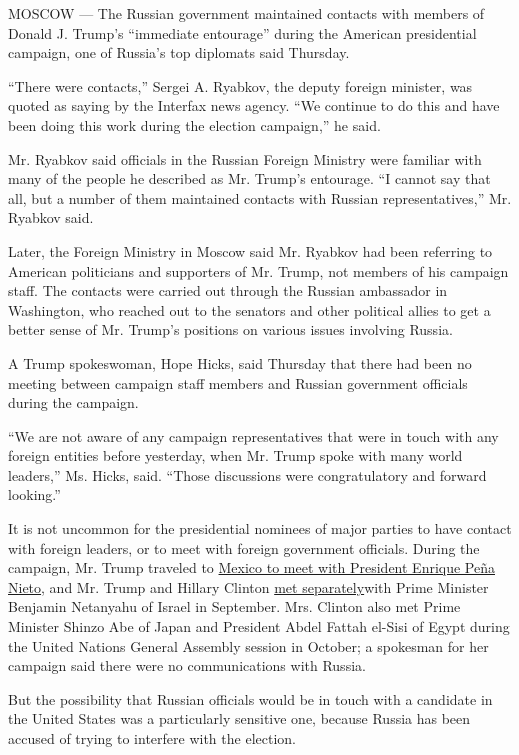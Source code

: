MOSCOW --- The Russian government maintained contacts with members of
Donald J. Trump's ``immediate entourage'' during the American
presidential campaign, one of Russia's top diplomats said Thursday.

``There were contacts,'' Sergei A. Ryabkov, the deputy foreign minister,
was quoted as saying by the Interfax news agency. ``We continue to do
this and have been doing this work during the election campaign,'' he
said.

Mr. Ryabkov said officials in the Russian Foreign Ministry were familiar
with many of the people he described as Mr. Trump's entourage. ``I
cannot say that all, but a number of them maintained contacts with
Russian representatives,'' Mr. Ryabkov said.

Later, the Foreign Ministry in Moscow said Mr. Ryabkov had been
referring to American politicians and supporters of Mr. Trump, not
members of his campaign staff. The contacts were carried out through the
Russian ambassador in Washington, who reached out to the senators and
other political allies to get a better sense of Mr. Trump's positions on
various issues involving Russia.

A Trump spokeswoman, Hope Hicks, said Thursday that there had been no
meeting between campaign staff members and Russian government officials
during the campaign.

``We are not aware of any campaign representatives that were in touch
with any foreign entities before yesterday, when Mr. Trump spoke with
many world leaders,'' Ms. Hicks, said. ``Those discussions were
congratulatory and forward looking.''

It is not uncommon for the presidential nominees of major parties to
have contact with foreign leaders, or to meet with foreign government
officials. During the campaign, Mr. Trump traveled to
\href{http://www.nytimes.com/video/us/elections/100000004621483/trump-addresses-mexico.html}{Mexico
to meet with President Enrique Peña Nieto}, and Mr. Trump and Hillary
Clinton
\href{http://www.cnn.com/2016/09/25/politics/netanyahu-trump-clinton-meetings/}{met
separately}with Prime Minister Benjamin Netanyahu of Israel in
September. Mrs. Clinton also met Prime Minister Shinzo Abe of Japan and
President Abdel Fattah el-Sisi of Egypt during the United Nations
General Assembly session in October; a spokesman for her campaign said
there were no communications with Russia.

But the possibility that Russian officials would be in touch with a
candidate in the United States was a particularly sensitive one, because
Russia has been accused of trying to interfere with the election.

